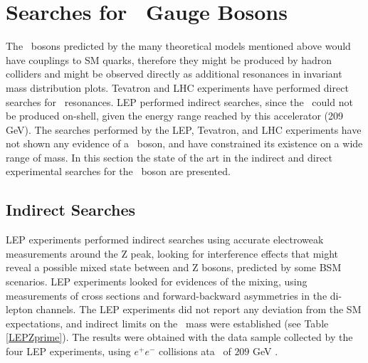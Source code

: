 % 

 
% 
% 


\section{Searches for \Zprime~Gauge Bosons}
\label{sec:Searches}


The \Zprime~bosons predicted by the many theoretical models mentioned above
 would have couplings to SM quarks, therefore they might be 
produced by hadron colliders and might be observed directly  as 
additional resonances in invariant mass distribution plots. Tevatron and LHC 
experiments have performed direct searches for \Zprime~resonances. LEP 
performed indirect searches, since the \Zprime~could not be produced on-shell, given the 
energy range reached by this accelerator (209 GeV). The searches 
performed by the LEP, Tevatron, and LHC experiments have not shown any
evidence of a \Zprime~boson, and have constrained its existence on a wide
range of mass. In this section the state of the art in the indirect and direct
experimental searches for the \Zprime~boson are presented.


\subsection{Indirect Searches}
\label{subsec:IndirectSearches}

LEP experiments performed indirect searches using accurate electroweak 
measurements around the Z peak, looking for interference effects that might reveal a 
possible mixed state between \Zprime and Z bosons, predicted by some BSM scenarios. LEP experiments 
looked for evidences of the mixing, using measurements of cross sections
and forward-backward asymmetries in the di-lepton channels. The LEP experiments did not report
any deviation from the SM expectations, and indirect limits on the \Zprime~mass were 
established (see Table \ref{LEPZprime}). The results were obtained with  the data sample 
collected by the four LEP experiments, using $e^{+}e^{-}$ collisions ata \centermassenergy~of $209$ GeV \cite{LEP1,LEP2}.

